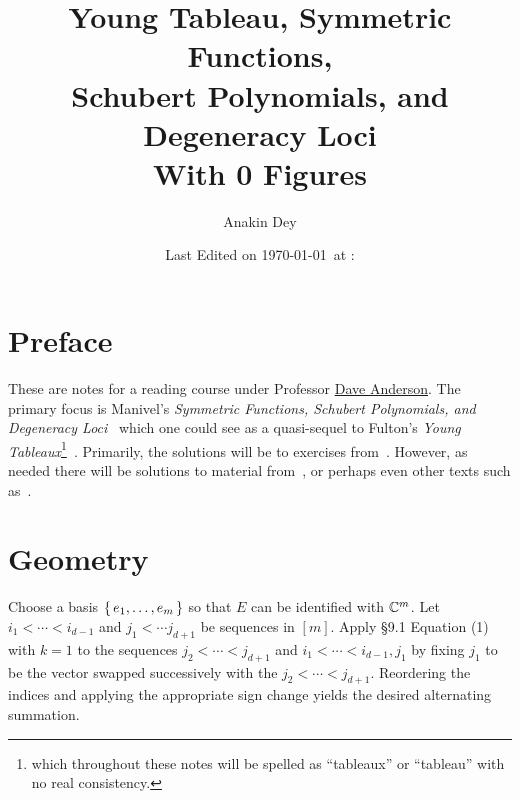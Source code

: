 \documentclass[letterpaper, 11pt, oneside]{book}
\title{\vspace{-100pt} {\Huge Young Tableau, Symmetric Functions, \protect\\ Schubert Polynomials, and Degeneracy Loci} \\ {\small With 0 Figures}}
\author{\Large Anakin Dey}
\date{\small Last Edited on \today\ at \DTMfetchhour{now}:\DTMfetchminute{now}}
\newcommand{\CoverName}{Cover}
\begin{document}
\frontmatter
\renewcommand{\thepage}{\CoverName}
\maketitle


\tableofcontents
\clearpage


%

\chapter*{Preface}

These are notes for a reading course under Professor \href{https://people.math.osu.edu/anderson.2804/index.html}{Dave Anderson}.
The primary focus is Manivel's \emph{Symmetric Functions, Schubert Polynomials, and Degeneracy Loci}~\cite{book:ManivelSFSPDL} which one could see as a quasi-sequel to Fulton's \emph{Young Tableaux}\footnote{which throughout these notes will be spelled as ``tableaux'' or ``tableau'' with no real consistency.}~\cite{book:YT}.
Primarily, the solutions will be to exercises from~\cite{book:ManivelSFSPDL}.
However, as needed there will be solutions to material from~\cite{book:YT}, or perhaps even other texts such as~\cite{book:MacdonaldSymmetricHall}.

\mainmatter

\chapter{\cite{book:YT} Geometry}

\begin{sol}\label{ex:YT_9.1.1}
  Choose a basis $\set{e_{1}, \ldots, e_{m}}$ so that $E$ can be identified with $\mathbb{C}^{m}$.
  Let $i_{1} < \cdots < i_{d - 1}$ and $j_{1} < \cdots j_{d + 1}$ be sequences in $[m]$.
  Apply \S 9.1 Equation (1) with $k = 1$ to the sequences $j_{2} < \cdots < j_{d + 1}$ and $i_{1} < \cdots < i_{d - 1}, j_{1}$ by fixing $j_{1}$ to be the vector swapped successively with the $j_{2} < \cdots < j_{d + 1}$.
  Reordering the indices and applying the appropriate sign change yields the desired alternating summation.
\end{sol}
\end{document}
